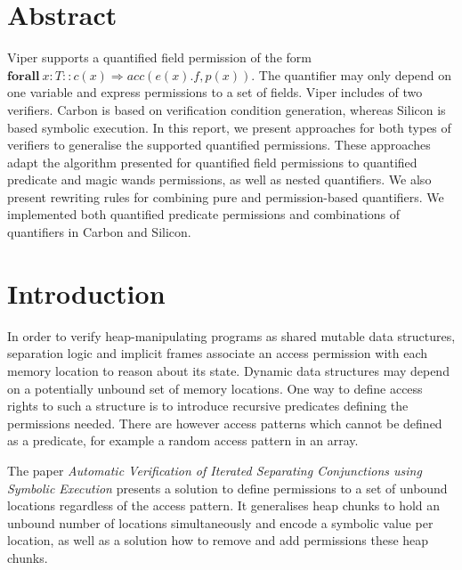 \documentclass[12pt]{article}
\begin{document}
\clearpage
\newcommand*{\ident}{\hspace*{0.5cm}}

\maketitle
\newpage

\clearpage
{}
\tableofcontents
\newpage
\clearpage
{}%
\section{Abstract}
Viper supports a quantified field permission of the form \(\mathbf{forall\ } x:T :: c(x) \Rightarrow acc(e(x).f, p(x))\). The quantifier may only depend on one variable and express permissions to a set of fields. Viper includes of two verifiers. Carbon is based on verification condition generation, whereas Silicon is based symbolic execution. In this report, we present approaches for both types of verifiers to generalise the supported quantified permissions. These approaches adapt the algorithm presented for quantified field permissions to quantified predicate and magic wands permissions, as well as nested quantifiers. We also present rewriting rules for combining pure and permission-based quantifiers.
We implemented both quantified predicate permissions and combinations of quantifiers in Carbon and Silicon.

\section{Introduction}
In order to verify heap-manipulating programs as shared mutable data structures, separation logic\cite{reynolds2002separation} and implicit frames\cite{smans2009implicit} associate an access permission with each memory location to reason about its state. 
Dynamic data structures may depend on a potentially unbound set of memory locations. One way to define access rights to such a structure is to introduce recursive predicates defining the permissions needed. There are however access patterns which cannot be defined as a predicate, for example a random access pattern in an array.

The paper \textit{Automatic Verification of Iterated Separating Conjunctions using Symbolic Execution}\cite{isc} presents a solution to define permissions to a set of unbound locations regardless of the access pattern. It generalises heap chunks to hold an unbound number of locations simultaneously and encode a symbolic value per location, as well as a solution how to remove and add permissions these heap chunks.
\end{document}
